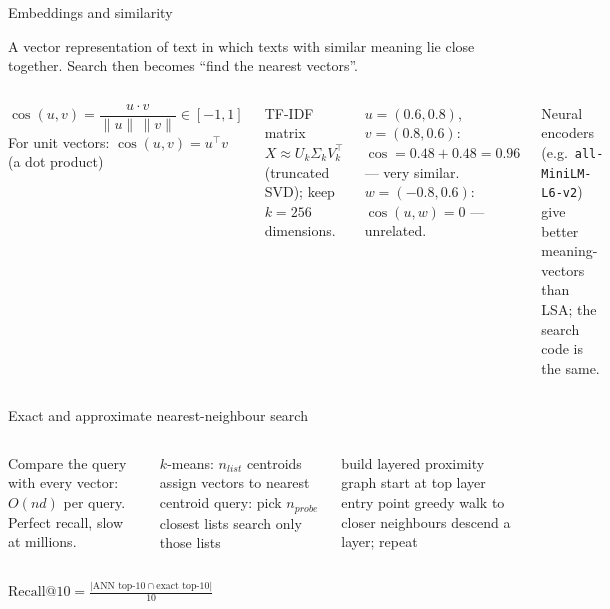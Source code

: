 \documentclass[aspectratio=169,11pt]{beamer}
\begin{document}

\begin{frame}{Embeddings and similarity}
\begin{bdef}[Embedding]
A vector representation of text in which texts with similar meaning lie close together. Search then becomes ``find the nearest vectors''.
\end{bdef}
\begin{columns}[T]
\begin{bmath}
$\cos(u,v)=\dfrac{u\cdot v}{\lVert u\rVert\,\lVert v\rVert}\in[-1,1]$\\[3pt]
For unit vectors: $\cos(u,v)=u^\top v$ (a dot product)
\end{bmath}
\begin{bmath}
TF-IDF matrix $X\approx U_k\Sigma_kV_k^\top$ (truncated SVD); keep $k=256$ dimensions.
\end{bmath}
\begin{bex}
$u=(0.6,0.8)$, $v=(0.8,0.6)$: $\cos=0.48+0.48=0.96$ --- very similar. $w=(-0.8,0.6)$: $\cos(u,w)=0$ --- unrelated.
\end{bex}
\begin{bdef}
Neural encoders (e.g.\ \texttt{all-MiniLM-L6-v2}) give better meaning-vectors than LSA; the search code is the same.
\end{bdef}
\end{columns}
\end{frame}

\begin{frame}{Exact and approximate nearest-neighbour search}
\begin{columns}[T]
\begin{bdef}
Compare the query with every vector: $O(nd)$ per query. Perfect recall, slow at millions.
\end{bdef}
\begin{balgo}[IVF]
\begin{algorithmic}[1]
\State $k$-means: $n_{list}$ centroids
\State assign vectors to nearest centroid
\State query: pick $n_{probe}$ closest lists
\State search only those lists
\end{algorithmic}
\end{balgo}
\begin{balgo}[HNSW]
\begin{algorithmic}[1]
\State build layered proximity graph
\State start at top layer entry point
\State greedy walk to closer neighbours
\State descend a layer; repeat
\end{algorithmic}
\end{balgo}
\end{columns}
\begin{bmath}
$\mathrm{Recall@10}=\frac{|\text{ANN top-10}\cap\text{exact top-10}|}{10}$
\end{bmath}
\end{frame}
\end{document}

